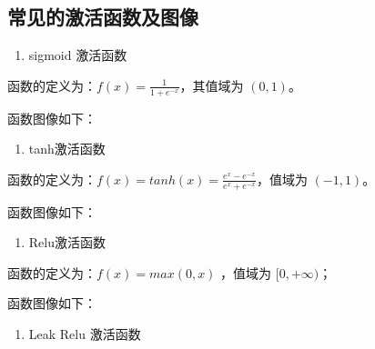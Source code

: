 \subsection{常见的激活函数及图像}\label{ux5e38ux89c1ux7684ux6fc0ux6d3bux51fdux6570ux53caux56feux50cf}

\begin{enumerate}
\def\labelenumi{\arabic{enumi}.}
 
\item
  sigmoid 激活函数
\end{enumerate}

函数的定义为：$ f(x) = \frac{1}{1 + e^{-x}} $，其值域为 $ (0,1) $。

函数图像如下：

 

\begin{enumerate}
\def\labelenumi{\arabic{enumi}.}
\setcounter{enumi}{1}
 
\item
  tanh激活函数
\end{enumerate}

函数的定义为：$ f(x) = tanh(x) = \frac{e^x - e^{-x}}{e^x + e^{-x}}
$，值域为 $ (-1,1) $。

函数图像如下：

 

\begin{enumerate}
\def\labelenumi{\arabic{enumi}.}
\setcounter{enumi}{2}
 
\item
  Relu激活函数
\end{enumerate}

函数的定义为：$ f(x) = max(0, x) $ ，值域为 $ {[}0,+∞) $；

函数图像如下：

 

\begin{enumerate}
\def\labelenumi{\arabic{enumi}.}
\setcounter{enumi}{3}
 
\item
  Leak Relu 激活函数
\end{enumerate}


